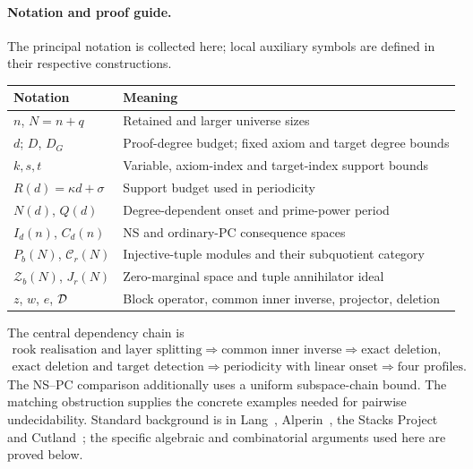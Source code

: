 \documentclass[11pt,a4paper]{article}
\theoremstyle{definition}\newtheorem{definition}[theorem]{Definition}
\theoremstyle{remark}\newtheorem{remark}[theorem]{Remark}
\begin{document}
\paragraph{Notation and proof guide.}\label{sec:specialist-tools}
The principal notation is collected here; local auxiliary symbols are
defined in their respective constructions.
\begin{center}
\begin{tabular}{@{}ll@{}}
\toprule
Notation & Meaning\\
\midrule
$n$, $N=n+q$ & Retained and larger universe sizes\\
$d$; $D$, $D_G$ & Proof-degree budget; fixed axiom and target degree bounds\\
$k,s,t$ & Variable, axiom-index and target-index support bounds\\
$R(d)=\kappa d+\sigma$ & Support budget used in periodicity\\
$N(d)$, $Q(d)$ & Degree-dependent onset and prime-power period\\
$I_d(n)$, $C_d(n)$ & NS and ordinary-PC consequence spaces\\
$P_b(N)$, $\mathcal C_r(N)$ & Injective-tuple modules and their subquotient category\\
$\mathcal Z_b(N)$, $J_r(N)$ & Zero-marginal space and tuple annihilator ideal\\
$z$, $w$, $e$, $\mathcal D$ & Block operator, common inner inverse, projector, deletion\\
\bottomrule
\end{tabular}
\end{center}
The central dependency chain is
\[
 \begin{gathered}
 \text{rook realisation and layer splitting}\Longrightarrow
 \text{common inner inverse}\Longrightarrow\text{exact deletion},\\
 \text{exact deletion and target detection}\Longrightarrow
 \text{periodicity with linear onset}\Longrightarrow\text{four profiles}.
 \end{gathered}
\]
The NS--PC comparison additionally uses a uniform subspace-chain bound.
The matching obstruction supplies the concrete examples needed for
pairwise undecidability. Standard background is in Lang~\cite{LangAlgebra},
Alperin~\cite{AlperinLocal}, the Stacks Project~\cite{StacksExact} and
Cutland~\cite{Cutland}; the specific algebraic and combinatorial
arguments used here are proved below.
\end{document}
